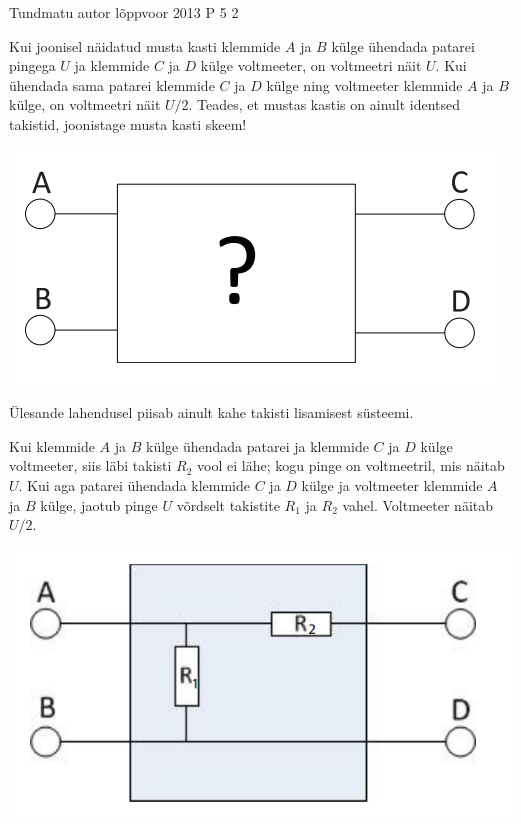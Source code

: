{Tundmatu autor} %
{lõppvoor} %
{2013} %
{P 5} %
{2} %
{

\ifStatement
Kui joonisel näidatud musta kasti klemmide $A$ ja $B$ külge ühendada patarei pingega $U$ ja klemmide $C$ ja $D$ külge voltmeeter, on voltmeetri näit $U$. Kui ühendada sama patarei klemmide $C$ ja $D$ külge ning voltmeeter klemmide $A$ ja $B$ külge, on voltmeetri näit $U/2$. Teades, et mustas kastis on ainult identsed takistid, joonistage musta kasti skeem!
\begin{center}
	\includegraphics[width=0.5\linewidth]{2013-v3p-05-yl.png}
\end{center}
\fi

\ifHint
Ülesande lahendusel piisab ainult kahe takisti lisamisest süsteemi.
\fi

\ifSolution
Kui klemmide $A$ ja $B$ külge ühendada patarei ja klemmide $C$ ja $D$ külge voltmeeter, siis läbi takisti $R_2$ vool ei lähe; kogu pinge on voltmeetril, mis näitab $U$. Kui aga patarei ühendada klemmide $C$ ja $D$ külge ja voltmeeter klemmide $A$ ja $B$ külge, jaotub pinge $U$ võrdselt takistite $R_1$ ja $R_2$ vahel. Voltmeeter näitab $U/2$.

\begin{center}
	\includegraphics[width=0.5\linewidth]{2013-v3p-05-lah.png}
\end{center}
\fi
}